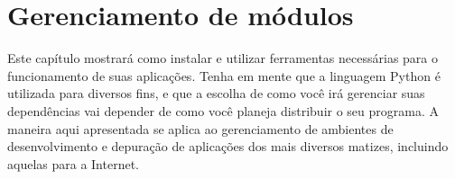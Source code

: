 \chapter{Gerenciamento de módulos}\label{chp:gerenciamento-de-módulos}

Este capítulo mostrará como instalar e utilizar ferramentas necessárias para o
funcionamento de suas aplicações. Tenha em mente que a linguagem Python é
utilizada para diversos fins, e que a escolha de como você irá gerenciar suas
dependências vai depender de como você planeja distribuir o seu programa. A
maneira aqui apresentada se aplica ao gerenciamento de ambientes de
desenvolvimento e depuração de aplicações dos mais diversos matizes, incluindo
aquelas para a Internet.

